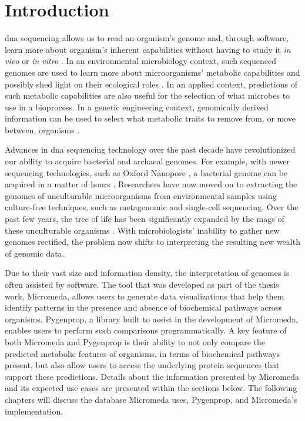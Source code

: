 \chapter{Introduction} \label{introduction}

\gls{dna} sequencing allows us to read an organism's genome and, through software, 
learn more about organism's inherent capabilities without having to study it \textit{in 
vivo} or \textit{in vitro} \cite{de2012bioinformatic}. In an environmental 
microbiology context, such sequenced genomes are used to learn more about 
microorganisms' metabolic capabilities and possibly shed light on their 
ecological roles \cite{de2012bioinformatic}. In an applied context, predictions 
of such metabolic capabilities are also useful for the selection of what 
microbes to use in a bioprocess. In a genetic engineering context, genomically 
derived information can be used to select what metabolic traits to remove from, 
or move between, organisms \cite{strohl2001biochemical,sanchez2005novel}.

Advances in \gls{dna} sequencing technology over the past decade have revolutionized 
our ability to acquire bacterial and archaeal genomes. For example, with newer 
sequencing technologies, such as Oxford Nanopore \cite{jain2016oxford}, a 
bacterial genome can be acquired in a matter of hours \cite{Lu2016,Cao2017}. 
Researchers have now moved on to extracting the genomes of unculturable 
microorganisms from environmental samples using culture-free techniques, such as 
metagenomic \cite{quince2017shotgun} and single-cell \cite{gawad2016single} 
sequencing. Over the past few years, the tree of life has been significantly 
expanded by the \gls{mags} \cite{bowers2017minimum} of these unculturable 
organisms \cite{Hug2016,Parks2017}. With microbiologists' inability to gather 
new genomes rectified, the problem now shifts to interpreting the resulting new 
wealth of genomic data.

Due to their vast size and information density, the interpretation of genomes is 
often assisted by software. The tool that was developed as part of the thesis 
work, Micromeda, allows users to generate data visualizations that help them 
identify patterns in the presence and absence of biochemical pathways across 
organisms. Pygenprop, a library built to assist in the development of Micromeda, 
enables users to perform such comparisons programmatically. A key feature of 
both Micromeda and Pygenprop is their ability to not only compare the predicted 
metabolic features of organisms, in terms of biochemical pathways present, but 
also allow users to access the underlying protein sequences that support these 
predictions. Details about the information presented by Micromeda and its 
expected use cases are presented within the sections below. The following 
chapters will discuss the database Micromeda uses, Pygenprop, and Micromeda's 
implementation.

